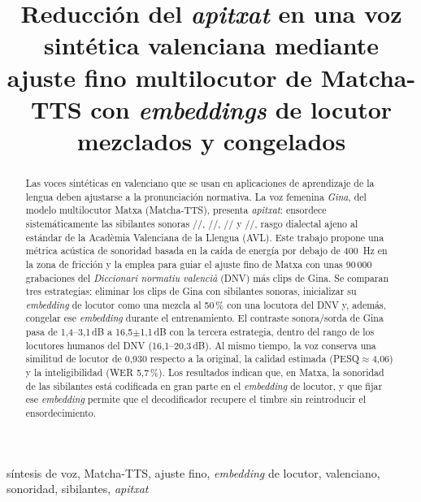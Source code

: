 \documentclass[conference]{IEEEtran}
\newcommand{\fz}{\textipa{z}}
\newcommand{\fdz}{\textipa{dz}}
\newcommand{\fZ}{\textipa{Z}}
\newcommand{\fdZ}{\textipa{dZ}}
\newcommand{\dB}{\,dB}
\begin{document}
\title{Reducción del \textit{apitxat} en una voz sintética valenciana mediante ajuste fino multilocutor de Matcha-TTS con \textit{embeddings} de locutor mezclados y congelados}

\author{
}

\maketitle

\begin{abstract}
Las voces sintéticas en valenciano que se usan en aplicaciones de aprendizaje de la lengua deben ajustarse a la pronunciación normativa. La voz femenina \textit{Gina}, del modelo multilocutor Matxa (Matcha-TTS), presenta \textit{apitxat}: ensordece sistemáticamente las sibilantes sonoras /\fz/, /\fdz/, /\fZ/ y /\fdZ/, rasgo dialectal ajeno al estándar de la Acadèmia Valenciana de la Llengua (AVL). Este trabajo propone una métrica acústica de sonoridad basada en la caída de energía por debajo de 400~Hz en la zona de fricción y la emplea para guiar el ajuste fino de Matxa con unas 90\,000 grabaciones del \textit{Diccionari normatiu valencià} (DNV) más clips de Gina. Se comparan tres estrategias: eliminar los clips de Gina con sibilantes sonoras, inicializar su \textit{embedding} de locutor como una mezcla al 50\,\% con una locutora del DNV y, además, congelar ese \textit{embedding} durante el entrenamiento. El contraste sonora/sorda de Gina pasa de 1,4--3,1\dB{} a 16,5$\pm$1,1\dB{} con la tercera estrategia, dentro del rango de los locutores humanos del DNV (16,1--20,3\dB). Al mismo tiempo, la voz conserva una similitud de locutor de 0,930 respecto a la original, la calidad estimada (PESQ$\approx$4,06) y la inteligibilidad (WER 5,7\,\%). Los resultados indican que, en Matxa, la sonoridad de las sibilantes está codificada en gran parte en el \textit{embedding} de locutor, y que fijar ese \textit{embedding} permite que el decodificador recupere el timbre sin reintroducir el ensordecimiento.
\end{abstract}

\begin{IEEEkeywords}
síntesis de voz, Matcha-TTS, ajuste fino, \textit{embedding} de locutor, valenciano, sonoridad, sibilantes, \textit{apitxat}
\end{IEEEkeywords}
\end{document}
